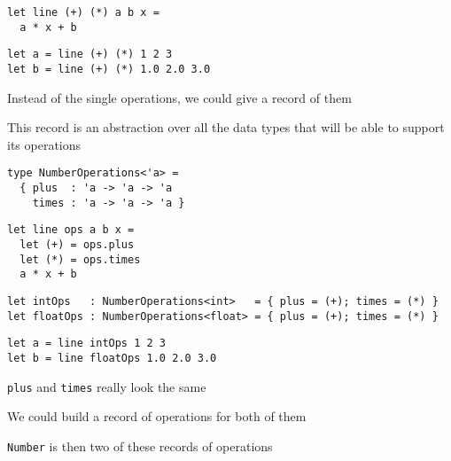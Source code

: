 \documentclass{beamer}
\begin{document}
\begin{frame}[fragile]
\begin{lstlisting}
let line (+) (*) a b x =
  a * x + b
\end{lstlisting}
\end{frame}

\begin{frame}[fragile]
\begin{lstlisting}
let a = line (+) (*) 1 2 3
let b = line (+) (*) 1.0 2.0 3.0
\end{lstlisting}
\end{frame}

\begin{slide}{
\item Instead of the single operations, we could give a record of them
\item This record is an abstraction over all the data types that will be able to support its operations
}\end{slide}

\begin{frame}[fragile]
\begin{lstlisting}
type NumberOperations<'a> = 
  { plus  : 'a -> 'a -> 'a
    times : 'a -> 'a -> 'a }
\end{lstlisting}
\end{frame}

\begin{frame}[fragile]
\begin{lstlisting}
let line ops a b x =
  let (+) = ops.plus
  let (*) = ops.times
  a * x + b
\end{lstlisting}
\end{frame}

\begin{frame}[fragile]
\begin{lstlisting}
let intOps   : NumberOperations<int>   = { plus = (+); times = (*) }
let floatOps : NumberOperations<float> = { plus = (+); times = (*) }
\end{lstlisting}
\end{frame}

\begin{frame}[fragile]
\begin{lstlisting}
let a = line intOps 1 2 3
let b = line floatOps 1.0 2.0 3.0
\end{lstlisting}
\end{frame}

\begin{slide}{
\item \texttt{plus} and \texttt{times} really look the same
\item We could build a record of operations for both of them
\item \texttt{Number} is then two of these records of operations
}\end{slide}
\end{document}
